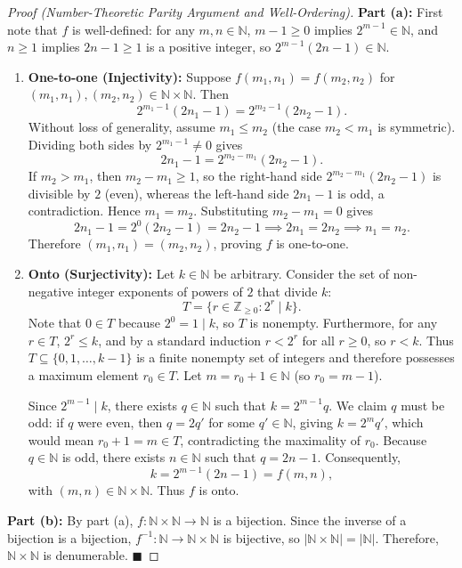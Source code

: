 \documentclass[11pt, letterpaper]{article}
\theoremstyle{definition}
\theoremstyle{remark}
\begin{document}
\begin{proof}[Proof (Number-Theoretic Parity Argument and Well-Ordering)]
\textbf{Part (a):} First note that $f$ is well-defined: for any $m, n \in \mathbb{N}$, $m - 1 \geq 0$ implies $2^{m-1} \in \mathbb{N}$, and $n \geq 1$ implies $2n - 1 \geq 1$ is a positive integer, so $2^{m-1}(2n - 1) \in \mathbb{N}$.

\begin{enumerate}[label=(\arabic*)]
    \item \textbf{One-to-one (Injectivity):} Suppose $f(m_1, n_1) = f(m_2, n_2)$ for $(m_1, n_1), (m_2, n_2) \in \mathbb{N} \times \mathbb{N}$. Then
    \[
    2^{m_1 - 1}(2n_1 - 1) = 2^{m_2 - 1}(2n_2 - 1).
    \]
    Without loss of generality, assume $m_1 \leq m_2$ (the case $m_2 < m_1$ is symmetric). Dividing both sides by $2^{m_1 - 1} \neq 0$ gives
    \[
    2n_1 - 1 = 2^{m_2 - m_1}(2n_2 - 1).
    \]
    If $m_2 > m_1$, then $m_2 - m_1 \geq 1$, so the right-hand side $2^{m_2 - m_1}(2n_2 - 1)$ is divisible by $2$ (even), whereas the left-hand side $2n_1 - 1$ is odd, a contradiction. Hence $m_1 = m_2$. Substituting $m_2 - m_1 = 0$ gives
    \[
    2n_1 - 1 = 2^0(2n_2 - 1) = 2n_2 - 1 \implies 2n_1 = 2n_2 \implies n_1 = n_2.
    \]
    Therefore $(m_1, n_1) = (m_2, n_2)$, proving $f$ is one-to-one.
    
    \item \textbf{Onto (Surjectivity):} Let $k \in \mathbb{N}$ be arbitrary. Consider the set of non-negative integer exponents of powers of $2$ that divide $k$:
    \[
    T = \{r \in \mathbb{Z}_{\geq 0} : 2^r \mid k\}.
    \]
    Note that $0 \in T$ because $2^0 = 1 \mid k$, so $T$ is nonempty. Furthermore, for any $r \in T$, $2^r \leq k$, and by a standard induction $r < 2^r$ for all $r \geq 0$, so $r < k$. Thus $T \subseteq \{0, 1, \dots, k - 1\}$ is a finite nonempty set of integers and therefore possesses a maximum element $r_0 \in T$. Let $m = r_0 + 1 \in \mathbb{N}$ (so $r_0 = m - 1$).
    
    Since $2^{m-1} \mid k$, there exists $q \in \mathbb{N}$ such that $k = 2^{m-1} q$. We claim $q$ must be odd: if $q$ were even, then $q = 2q'$ for some $q' \in \mathbb{N}$, giving $k = 2^m q'$, which would mean $r_0 + 1 = m \in T$, contradicting the maximality of $r_0$. Because $q \in \mathbb{N}$ is odd, there exists $n \in \mathbb{N}$ such that $q = 2n - 1$. Consequently,
    \[
    k = 2^{m-1}(2n - 1) = f(m, n),
    \]
    with $(m, n) \in \mathbb{N} \times \mathbb{N}$. Thus $f$ is onto.
\end{enumerate}

\textbf{Part (b):} By part (a), $f : \mathbb{N} \times \mathbb{N} \to \mathbb{N}$ is a bijection. Since the inverse of a bijection is a bijection, $f^{-1} : \mathbb{N} \to \mathbb{N} \times \mathbb{N}$ is bijective, so $|\mathbb{N} \times \mathbb{N}| = |\mathbb{N}|$. Therefore, $\mathbb{N} \times \mathbb{N}$ is denumerable. $\blacksquare$
\end{proof}
\end{document}
